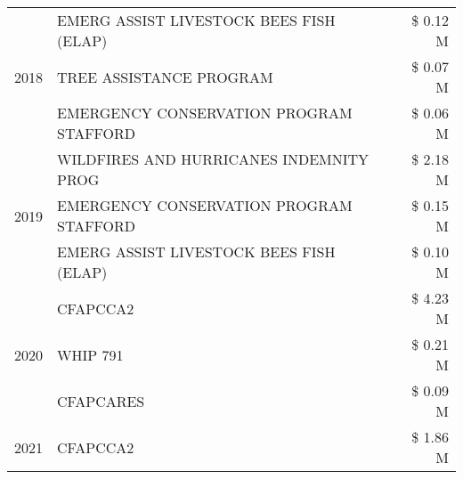 \begin{tabular}{llr}
\cline{1-3}
\multirow[t]{3}{*}{2018} & EMERG ASSIST LIVESTOCK BEES FISH (ELAP) & \$ 0.12 M \\
 & TREE ASSISTANCE PROGRAM & \$ 0.07 M \\
 & EMERGENCY CONSERVATION PROGRAM STAFFORD & \$ 0.06 M \\
\cline{1-3}
\multirow[t]{3}{*}{2019} & WILDFIRES AND HURRICANES INDEMNITY PROG & \$ 2.18 M \\
 & EMERGENCY CONSERVATION PROGRAM STAFFORD & \$ 0.15 M \\
 & EMERG ASSIST LIVESTOCK BEES FISH (ELAP) & \$ 0.10 M \\
\cline{1-3}
\multirow[t]{3}{*}{2020} & CFAPCCA2 & \$ 4.23 M \\
 & WHIP 791 & \$ 0.21 M \\
 & CFAPCARES & \$ 0.09 M \\
\cline{1-3}
2021 & CFAPCCA2 & \$ 1.86 M \\
\cline{1-3}
\bottomrule
\end{tabular}
